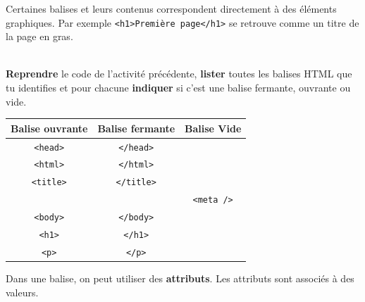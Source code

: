 \documentclass[a4paper,17pt]{extarticle}
\newenvironment{eleve}%
{\begin{activite}\color{noiramu}\\}
{\end{activite}}
\begin{document}
Certaines balises et leurs contenus correspondent directement à des
éléments graphiques. Par exemple
\texttt{\textless{}h1\textgreater{}Première\ page\textless{}/h1\textgreater{}}
se retrouve comme un titre de la page en gras.
\begin{eleve}
    \textbf{Reprendre} le code de l'activité précédente, \textbf{lister}
toutes les balises HTML que tu identifies et pour chacune
\textbf{indiquer} si c'est une balise fermante, ouvrante ou vide.
        
        \end{eleve}\begin{reponse}
    \begin{longtable}[]{@{}ccc@{}}
\toprule
Balise ouvrante & Balise fermante & Balise Vide\tabularnewline
\midrule
\endhead
\texttt{\textless{}head\textgreater{}} &
\texttt{\textless{}/head\textgreater{}} &\tabularnewline
\texttt{\textless{}html\textgreater{}} &
\texttt{\textless{}/html\textgreater{}} &\tabularnewline
\texttt{\textless{}title\textgreater{}} &
\texttt{\textless{}/title\textgreater{}} &\tabularnewline
& & \texttt{\textless{}meta\ /\textgreater{}}\tabularnewline
\texttt{\textless{}body\textgreater{}} &
\texttt{\textless{}/body\textgreater{}} &\tabularnewline
\texttt{\textless{}h1\textgreater{}} &
\texttt{\textless{}/h1\textgreater{}} &\tabularnewline
\texttt{\textless{}p\textgreater{}} &
\texttt{\textless{}/p\textgreater{}} &\tabularnewline
\bottomrule
\end{longtable}

            \end{reponse}
    Dans une balise, on peut utiliser des \textbf{attributs}. Les attributs
sont associés à des valeurs.
\end{document}
